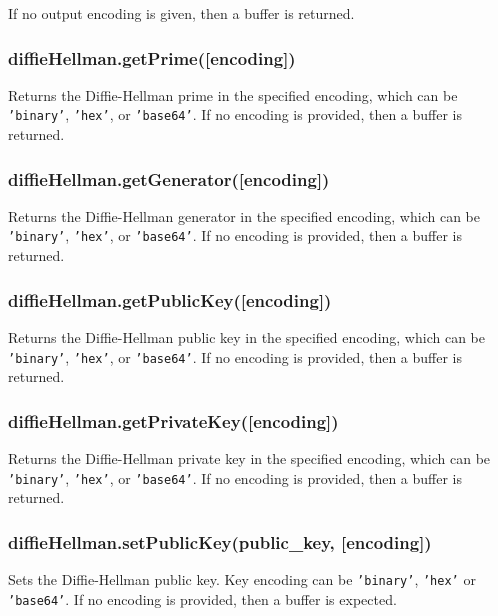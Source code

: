 If no output encoding is given, then a buffer is returned.

\subsubsection{diffieHellman.getPrime({[}encoding{]})}\label{diffiehellman.getprimeencoding}

Returns the Diffie-Hellman prime in the specified encoding, which can be
\texttt{'binary'}, \texttt{'hex'}, or \texttt{'base64'}. If no encoding
is provided, then a buffer is returned.

\subsubsection{diffieHellman.getGenerator({[}encoding{]})}\label{diffiehellman.getgeneratorencoding}

Returns the Diffie-Hellman generator in the specified encoding, which
can be \texttt{'binary'}, \texttt{'hex'}, or \texttt{'base64'}. If no
encoding is provided, then a buffer is returned.

\subsubsection{diffieHellman.getPublicKey({[}encoding{]})}\label{diffiehellman.getpublickeyencoding}

Returns the Diffie-Hellman public key in the specified encoding, which
can be \texttt{'binary'}, \texttt{'hex'}, or \texttt{'base64'}. If no
encoding is provided, then a buffer is returned.

\subsubsection{diffieHellman.getPrivateKey({[}encoding{]})}\label{diffiehellman.getprivatekeyencoding}

Returns the Diffie-Hellman private key in the specified encoding, which
can be \texttt{'binary'}, \texttt{'hex'}, or \texttt{'base64'}. If no
encoding is provided, then a buffer is returned.

\subsubsection{diffieHellman.setPublicKey(public\_key,
{[}encoding{]})}\label{diffiehellman.setpublickeypublicux5fkey-encoding}

Sets the Diffie-Hellman public key. Key encoding can be
\texttt{'binary'}, \texttt{'hex'} or \texttt{'base64'}. If no encoding
is provided, then a buffer is expected.

